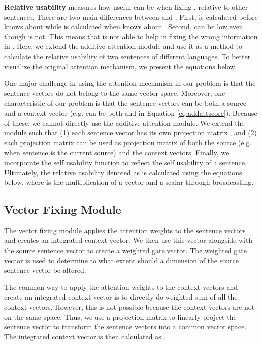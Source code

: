 \documentclass{article}
\begin{document}
\textbf{Relative usability}  measures how useful  can be when fixing , relative to other sentences. There are two main differences between  and . First,  is calculated before  knows about  while  is calculated when  knows about . Second,  can be low even though  is not. This means that  is not able to help in fixing the wrong information in .
Here, we extend the additive attention module \cite{bahdanau2014neural} and use it as a method to calculate the relative usability of two sentences of different languages. To better visualize the original attention mechanism, we present the equations below.

One major challenge in using the attention mechanism in our problem is that the sentence vectors do not belong to the same vector space. Moreover, one characteristic of our problem is that the sentence vectors can be both a source and a context vector (e.g.  can be both  and  in Equation \ref{eq:addattscore}). Because of these, we cannot directly use the additive attention module. We extend the module such that (1) each sentence vector  has its own projection matrix , and (2) each projection matrix  can be used as projection matrix of both the source (e.g. when sentence  is the current source) and the context vectors. Finally, we incorporate the self usability function  to reflect the self usability of a sentence. Ultimately, the relative usability denoted as  is calculated using the equations below, where  is the multiplication of a vector and a scalar through broadcasting.

\subsection{Vector Fixing Module}

The vector fixing module applies the attention weights to the sentence vectors and creates an integrated context vector. We then use this vector alongside with the source sentence vector to create a weighted gate vector. The weighted gate vector is used to determine to what extent should a dimension of the source sentence vector be altered.

The common way to apply the attention weights to the context vectors and create an integrated context vector  is to directly do weighted sum of all the context vectors.
However, this is not possible because the context vectors are not on the same space. Thus, we use a projection matrix  to linearly project the sentence vector  to transform the sentence vectors into a common vector space. The integrated context vector  is then calculated as
.
\end{document}
